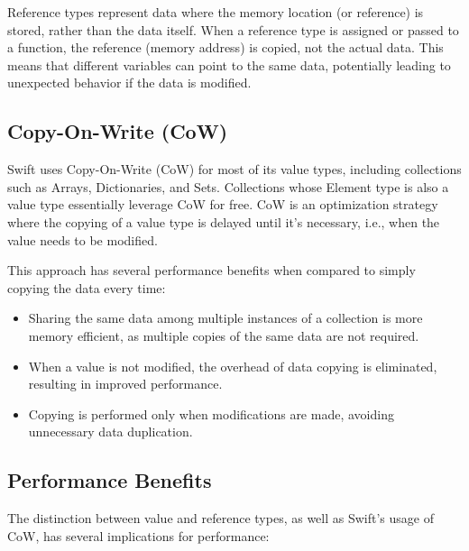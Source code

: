 Reference types represent data where the memory location (or reference) is stored, rather than the data itself. When a reference type is assigned or passed to a function, the reference (memory address) is copied, not the actual data. This means that different variables can point to the same data, potentially leading to unexpected behavior if the data is modified.

\subsection{Copy-On-Write (CoW)}

Swift uses Copy-On-Write (CoW) for most of its value types, including collections such as Arrays, Dictionaries, and Sets. Collections whose Element type is also a value type essentially leverage CoW for free. CoW is an optimization strategy where the copying of a value type is delayed until it's necessary, i.e., when the value needs to be modified.

This approach has several performance benefits when compared to simply copying the data every time:

\begin{itemize}
  \item Sharing the same data among multiple instances of a collection is more memory efficient, as multiple copies of the same data are not required.
  \item When a value is not modified, the overhead of data copying is eliminated, resulting in improved performance.
  \item Copying is performed only when modifications are made, avoiding unnecessary data duplication.
\end{itemize}

\subsection{Performance Benefits}

The distinction between value and reference types, as well as Swift's usage of CoW, has several implications for performance:

